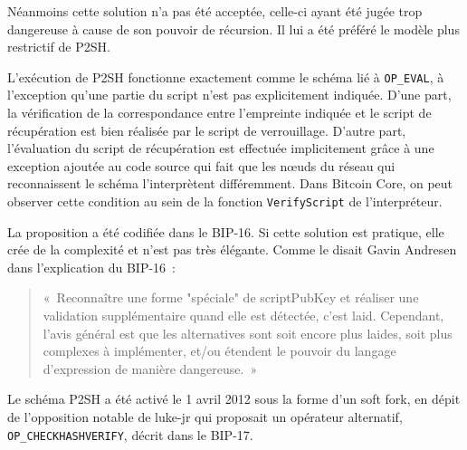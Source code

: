 Néanmoins cette solution n'a pas été acceptée, celle-ci ayant été jugée trop dangereuse à cause de son pouvoir de récursion. Il lui a été préféré le modèle plus restrictif de P2SH.

L'exécution de P2SH fonctionne exactement comme le schéma lié à \texttt{OP\_EVAL}, à l'exception qu'une partie du script n'est pas explicitement indiquée. D'une part, la vérification de la correspondance entre l'empreinte indiquée et le script de récupération est bien réalisée par le script de verrouillage. D'autre part, l'évaluation du script de récupération est effectuée implicitement grâce à une exception ajoutée au code source qui fait que les nœuds du réseau qui reconnaissent le schéma l'interprètent différemment. Dans Bitcoin Core, on peut observer cette condition au sein de la fonction \texttt{VerifyScript} de l'interpréteur.

La proposition a été codifiée dans le BIP-16. Si cette solution est pratique, elle crée de la complexité et n'est pas très élégante. Comme le disait Gavin Andresen dans l'explication du BIP-16~:

\begin{quote}
«~Reconnaître une forme "spéciale" de scriptPubKey et réaliser une validation supplémentaire quand elle est détectée, c'est laid. Cependant, l'avis général est que les alternatives sont soit encore plus laides, soit plus complexes à implémenter, et/ou étendent le pouvoir du langage d'expression de manière dangereuse.~»
\end{quote}

Le schéma P2SH a été activé le 1\ier{} avril 2012 sous la forme d'un soft fork, en dépit de l'opposition notable de luke-jr qui proposait un opérateur alternatif, \texttt{OP\_CHECKHASHVERIFY}, décrit dans le BIP-17.

